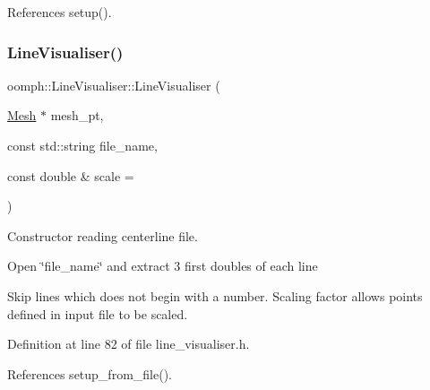 References setup().

\mbox{\label{classoomph_1_1LineVisualiser_a3eb2567997926ed29a6c8731d1e677c0}} 
\subsubsection{\texorpdfstring{Line\+Visualiser()}{LineVisualiser()}\hspace{0.1cm}{\footnotesize\ttfamily [2/3]}}
{\footnotesize\ttfamily oomph\+::\+Line\+Visualiser\+::\+Line\+Visualiser (\begin{DoxyParamCaption}\item[{\hyperlink{classoomph_1_1Mesh}{Mesh} $\ast$}]{mesh\+\_\+pt,  }\item[{const std\+::string}]{file\+\_\+name,  }\item[{const double \&}]{scale = {} }\end{DoxyParamCaption})\hspace{0.3cm}{\ttfamily [inline]}}



Constructor reading centerline file. 


\begin{DoxyItemize}
\item Open \char`\"{}file\+\_\+name\char`\"{} and extract 3 first doubles of each line
\item Skip lines which does not begin with a number. Scaling factor allows points defined in input file to be scaled. 
\end{DoxyItemize}

Definition at line 82 of file line\+\_\+visualiser.\+h.



References setup\+\_\+from\+\_\+file().

\mbox{\label{classoomph_1_1LineVisualiser_ab299c77effef14974955204e43457812}} 
